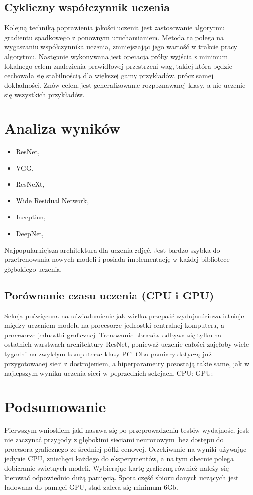 \documentclass[12pt,a4paper,twoside,titlepage,openright]{book}
\begin{document}
\subsection{Cykliczny współczynnik uczenia}
Kolejną techniką poprawienia jakości uczenia jest zastosowanie algorytmu gradientu spadkowego z ponownym uruchamianiem. Metoda ta polega na wygaszaniu współczynnika uczenia, zmniejszając jego wartość w trakcie pracy algorytmu. Następnie wykonywana jest operacja próby wyjścia z minimum lokalnego celem znalezienia prawidłowej przestrzeni wag, takiej która będzie cechowała się stabilnością dla większej gamy przykładów, prócz samej dokładności. Znów celem jest generalizowanie rozpoznawanej klasy, a nie uczenie się wszystkich przykładów. \cite{DBLP:journals/corr/HuangLPLHW17}

\section{Analiza wyników}
\begin{itemize}
\item ResNet,
\item VGG,
\item ResNeXt,
\item Wide Residual Network,
\item Inception,
\item DeepNet,
\end{itemize}
Najpopularniejsza architektura dla uczenia zdjęć. Jest bardzo szybka do przetrenowania nowych modeli i posiada implementację w każdej bibliotece głębokiego uczenia. 


\subsection{Porównanie czasu uczenia (CPU i GPU)}
Sekcja poświęcona na uświadomienie jak wielka przepaść wydajnościowa istnieje między uczeniem modelu na procesorze jednostki centralnej komputera, a procesorze jednostki graficznej. Trenowanie obrazów odbywa się tylko na ostatnich warstwach architektury ResNet, ponieważ uczenie całości zajęłoby wiele tygodni na zwykłym komputerze klasy PC.
Oba pomiary dotyczą już przygotowanej sieci z dostrojeniem, a hiperparametry pozostają takie same, jak w najlepszym wyniku uczenia sieci w poprzednich sekcjach.
CPU:
GPU:

\section{Podsumowanie}
Pierwszym wnioskiem jaki nasuwa się po przeprowadzeniu testów wydajności jest: nie zaczynać przygody z głębokimi sieciami neuronowymi bez dostępu do procesora graficznego ze średniej półki cenowej. Oczekiwanie na wyniki używając jedynie CPU, zniechęci każdego do eksperymentów, a na tym obecnie polega dobieranie świetnych modeli. Wybierając kartę graficzną również należy się kierować odpowiednio dużą pamięcią. Spora część zbioru danych uczących jest ładowana do pamięci GPU, stąd zaleca się minimum 6Gb.
\end{document}

